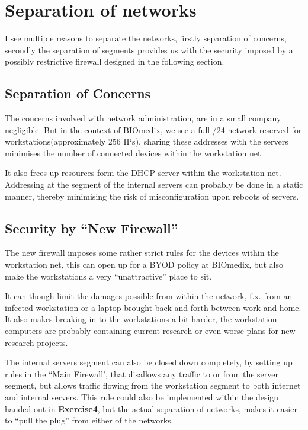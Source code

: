 \section{Separation of networks}
I see multiple reasons to separate the networks, firstly separation of
concerns, secondly the separation of segments provides us with the security
imposed by a possibly restrictive firewall designed in the following section.

\subsection{Separation of Concerns}
The concerns involved with network administration, are in a small company
negligible. But in the context of BIOmedix, we see a full /24 network
reserved for workstations(approximately 256 IPs), sharing these addresses with
the servers minimises the number of connected devices within the workstation
net.

It also frees up resources form the DHCP server within the workstation net.
Addressing at the segment of the internal servers can probably be done in a
static manner, thereby minimising the risk of misconfiguration upon reboots of
servers.

\subsection{Security by ``New Firewall''}
The new firewall imposes some rather strict rules for the devices within the
workstation net, this can open up for a BYOD policy at BIOmedix, but also make
the workstations a very ``unattractive'' place to sit.

It can though limit the damages possible from within the network, f.x. from
an infected workstation or a laptop brought back and forth between work and
home. It also makes breaking in to the workstations a bit harder, the
workstation computers are probably containing current research or even worse
plans for new research projects.

The internal servers segment can also be closed down completely, by setting up
rules in the ``Main Firewall', that disallows any traffic to or from the server
segment, but allows traffic flowing from the workstation segment to both
internet and internal servers. This rule could also be implemented within the
design handed out in \textbf{Exercise4}, but the actual separation of networks,
makes it easier to ``pull the plug'' from either of the networks.
